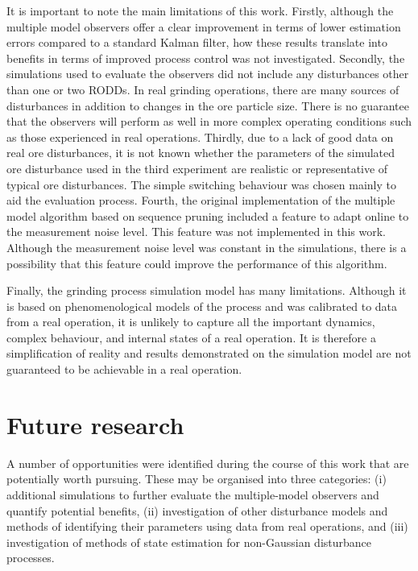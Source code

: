 It is important to note the main limitations of this work. Firstly, although the multiple model observers offer a clear improvement in terms of lower estimation errors compared to a standard Kalman filter, how these results translate into benefits in terms of improved process control was not investigated. Secondly, the simulations used to evaluate the observers did not include any disturbances other than one or two RODDs. In real grinding operations, there are many sources of disturbances in addition to changes in the ore particle size. There is no guarantee that the observers will perform as well in more complex operating conditions such as those experienced in real operations. Thirdly, due to a lack of good data on real ore disturbances, it is not known whether the parameters of the simulated ore disturbance used in the third experiment are realistic or representative of typical ore disturbances. The simple switching behaviour was chosen mainly to aid the evaluation process. Fourth, the original implementation of the multiple model algorithm based on sequence pruning \citep{eriksson_classification_1996} included a feature to adapt online to the measurement noise level. This feature was not implemented in this work. Although the measurement noise level was constant in the simulations, there is a possibility that this feature could improve the performance of this algorithm.

Finally, the grinding process simulation model has many limitations. Although it is based on phenomenological models of the process and was calibrated to data from a real operation, it is unlikely to capture all the important dynamics, complex behaviour, and internal states of a real operation. It is therefore a simplification of reality and results demonstrated on the simulation model are not guaranteed to be achievable in a real operation.

\section*{Future research} \label{sec:future-research}

A number of opportunities were identified during the course of this work that are potentially worth pursuing. These may be organised into three categories: (i) additional simulations to further evaluate the multiple-model observers and quantify potential benefits, (ii) investigation of other disturbance models and methods of identifying their parameters using data from real operations, and (iii) investigation of methods of state estimation for non-Gaussian disturbance processes.

